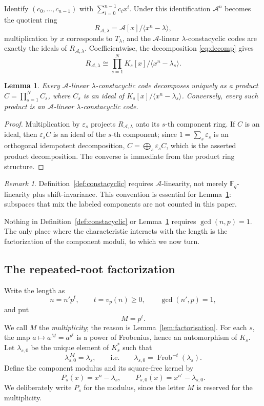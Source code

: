 \documentclass[11pt,a4paper]{article}
\newcommand{\F}{\mathbb F}
\newcommand{\A}{\mathcal A}
\newcommand{\Frob}{\operatorname{Frob}}
\numberwithin{equation}{section}
\theoremstyle{plain}
\newtheorem{lemma}[theorem]{Lemma}
\theoremstyle{definition}
\theoremstyle{remark}
\newtheorem{remark}[theorem]{Remark}
\begin{document}
Identify $(c_0,\ldots,c_{n-1})$ with $\sum_{i=0}^{n-1}c_ix^i$.  Under this
identification $\A^n$ becomes the quotient ring
\[
R_{\A,\lambda}=\A[x]/\langle x^n-\lambda\rangle,
\]
multiplication by $x$ corresponds to $T_\lambda$, and the $\A$-linear
$\lambda$-constacyclic codes are exactly the ideals of $R_{\A,\lambda}$.
Coefficientwise, the decomposition \eqref{eq:decomp} gives
\[
R_{\A,\lambda}\cong\prod_{s=1}^{N}K_s[x]/\langle x^n-\lambda_s\rangle .
\]

\begin{lemma}\label{lem:components}
Every $\A$-linear $\lambda$-constacyclic code decomposes uniquely as a product
$C=\prod_{s=1}^{N}C_s$, where $C_s$ is an ideal of
$K_s[x]/\langle x^n-\lambda_s\rangle$.  Conversely, every such product is an
$\A$-linear $\lambda$-constacyclic code.
\end{lemma}

\begin{proof}
Multiplication by $\varepsilon_s$ projects $R_{\A,\lambda}$ onto its $s$-th
component ring.  If $C$ is an ideal, then $\varepsilon_s C$ is an ideal of the
$s$-th component; since $1=\sum_s\varepsilon_s$ is an orthogonal idempotent
decomposition, $C=\bigoplus_s\varepsilon_s C$, which is the asserted product
decomposition.  The converse is immediate from the product ring structure.
\end{proof}

\begin{remark}\label{rem:Alinear}
Definition~\ref{def:constacyclic} requires $\A$-linearity, not merely
$\F_q$-linearity plus shift-invariance.  This convention is essential for
Lemma~\ref{lem:components}: subspaces that mix the labeled components are
not counted in this paper.
\end{remark}

Nothing in Definition~\ref{def:constacyclic} or Lemma~\ref{lem:components}
requires $\gcd(n,p)=1$.  The only place where the characteristic interacts with
the length is the factorization of the component moduli, to which we now turn.

\subsection{The repeated-root factorization}\label{sec:factorisation}

Write the length as
\[
n=n'p^t,\qquad t=v_p(n)\geq0,\qquad \gcd(n',p)=1,
\]
and put
\[
M=p^t .
\]
We call $M$ the \emph{multiplicity}; the reason is Lemma~\ref{lem:factorisation}.
For each $s$, the map $a\mapsto a^M=a^{p^t}$ is a power of Frobenius, hence an
automorphism of $K_s$.  Let $\lambda_{s,0}$ be the unique element of $K_s^\ast$
such that
\begin{equation}\label{eq:lambda0}
\lambda_{s,0}^{\,M}=\lambda_s,
\qquad\text{i.e.}\qquad
\lambda_{s,0}=\Frob^{-t}(\lambda_s).
\end{equation}
Define the component modulus and its square-free kernel by
\[
P_s(x)=x^n-\lambda_s,\qquad P_{s,0}(x)=x^{n'}-\lambda_{s,0}.
\]
We deliberately write $P_s$ for the modulus, since the letter $M$ is reserved
for the multiplicity.
\end{document}
